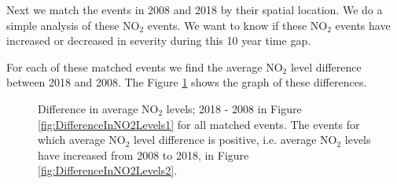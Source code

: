\documentclass[a4paper,11pt]{article}
\begin{document}
Next we match the events in 2008 and 2018 by their spatial location. We do a simple analysis of these $\text{NO}_2$ events. We want to know if these $\text{NO}_2$ events have increased or decreased in severity during this 10 year time gap.

For each of these matched events we find the average $\text{NO}_2$ level difference between 2018 and 2008. The Figure \ref{fig:DifferenceInNO2Levels} shows the graph of these differences.

\begin{figure}[H]
	\centering
	\caption{\footnotesize Difference in average $\text{NO}_2$ levels; 2018 - 2008 in Figure \ref{fig:DifferenceInNO2Levels1} for all matched events. The events for which average $\text{NO}_2$ level difference is positive, i.e. average $\text{NO}_2$ levels have increased from 2008 to 2018, in Figure \ref{fig:DifferenceInNO2Levels2}.}
	\label{fig:DifferenceInNO2Levels}
\end{figure}
\end{document}
